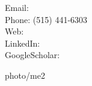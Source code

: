 \documentclass[letterpaper,11pt]{article}
\begin{document}


{
    Email:  \\
    Phone: (515) 441-6303\\
    Web:  \\ 
    LinkedIn:  \\
    GoogleScholar: 

}
{photo/me2}









%




\end{document}
